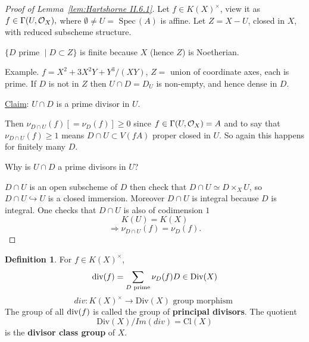 \documentclass[11pt]{article}
\theoremstyle{definition}
\newtheorem{dfn}[thm]{Definition}
\newcommand{\spec}{\text{ Spec}\,}
\newcommand{\calo}{{\cal O}}
\renewcommand{\div}{\textnormal{div}}
\newcommand{\Lrta}{\Longrightarrow}
\newcommand{\lrta}{\longrightarrow}
\newcommand{\inj}{\hookrightarrow}
\begin{document}
\begin{proof}[Proof of Lemma~\ref{lem:Hartshorne II.6.1}]
Let $f\in K(X)^\times$, view it as $f\in \Gamma(U,\calo_X),$ where $\emptyset \neq U=\spec(A)$ is affine. Let $Z=X-U$, closed in $X$, with reduced subscheme structure.

$\{D\text{ prime }\mid D\subset Z \}$ is finite because $X$ (hence $Z$) is  Noetherian.

Example. $f=X^2+3X^2Y+Y^3/(XY)$, $Z=$ union of coordinate axes, each is prime. If $D$ is not in $Z$ then $U\cap D=D_U$ is non-empty, and hence dense in $D$.

 \underline{Claim}: $U\cap D$ is a prime divisor in $U$.

  Then $\nu_{D\cap U}(f)[=\nu_D(f)]\geq 0$ since $f\in \Gamma(U,\calo_X)=A$ and to say that $\nu_{D\cap U}(f)\geq 1$ means $D\cap U\subset V(fA)$ proper closed in $U$. So again this happens for finitely many $D$.

Why is $U\cap D$ a prime divisors in $U$?
\begin{center}




\end{center}
$D\cap U$ is an open subscheme of $D$ then check that $D\cap U\simeq D\times_X U$, so $D\cap U\inj U$ is a closed immersion. Moreover $D\cap U$ is integral because $D$ is integral. One checks that $D\cap U$ is also of codimension $1$
$$
K(U)=K(X)
$$
$$
\Lrta \nu_{D\cap U}(f)=\nu_D(f).
$$
\end{proof}
\begin{dfn}
For 
$f\in K(X)^\times$,
$$
\div(f)=\sum_{D\text{ prime}} \nu_D(f) D \in \text{Div}(X)
$$
$$
div:K(X)^\times\lrta \text{Div}(X)\text{ group morphism }
$$
The group of all $\div(f) $ is called the group of \textbf{principal divisors}. The quotient
$$
\text{Div}(X)/Im(div)=\text{Cl}(X)
$$
is the \textbf{divisor class group } of $X$.
\end{dfn}
\end{document}
